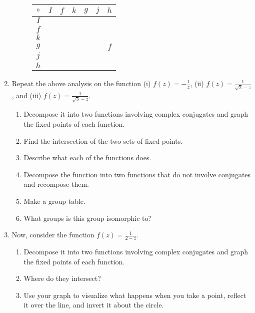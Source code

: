 \documentclass[../gatm.tex]{subfiles}
\begin{document}
\begin{enumerate}
\begin{figure}[h]
\begin{center}
\begin{minipage}[c]{0.35\textwidth}
			\begin{center}
				\begin{minipage}[b]{\textwidth}
					\centering
					\begin{tabular}{c|cccccc}
						\hline
						$\circ$ & $I$ & $f$ & $k$ & $g$ & $j$ & $h$ \\ \hline
						\rowcolor{light-gray}
						$I$ & & & & & & \\
						$f$ & & & & & & \\
						\rowcolor{light-gray}
						$k$ & & & & & & \\
						$g$ & & & & & & $f$\\
						\rowcolor{light-gray}
						$j$ & & & & & & \\
						$h$ & & & & & & \\ \hline
					\end{tabular}
				\end{minipage}
			\end{center}
		\end{minipage}
	\end{center}
	\vspace*{-2\baselineskip}
\end{figure}
\item Repeat the above analysis on the function (i) $f(z)=-\frac{1}{z}$, (ii) $f(z)=\frac{1}{\sqrt{2}-z}$, and (iii) $f(z)=\frac{1}{\sqrt{3}-z}$.
\begin{enumerate}
\item Decompose it into two functions involving complex conjugates and graph the fixed points of each function.
\item Find the intersection of the two sets of fixed points.
\item Describe what each of the functions does.
\item Decompose the function into two functions that do not involve conjugates and recompose them.
\item Make a group table.
\item What groups is this group isomorphic to?
\end{enumerate}
\item Now, consider the function $f(z)=\frac{1}{2-z}$.
\begin{enumerate}
\item Decompose it into two functions involving complex conjugates and graph the fixed points of each function.
\item Where do they intersect?
\item Use your graph to visualize what happens when you take a point, reflect it over the line, and invert it about the circle.

\end{enumerate}
\end{enumerate}
\end{document}
